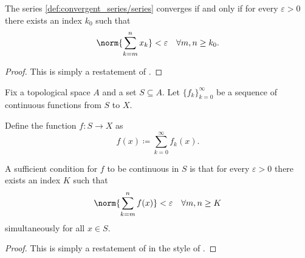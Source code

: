 \begin{proposition}\label{thm:cauchy_series_convergence_criterion}
  The series \eqref{def:convergent_series/series} converges if and only if for every \( \varepsilon > 0 \) there exists an index \( k_0 \) such that
  \begin{equation*}
    \norm{\sum_{k=m}^n x_k} < \varepsilon \quad\forall m, n \geq k_0.
  \end{equation*}
\end{proposition}
\begin{proof}
  This is simply a restatement of .
\end{proof}

\begin{proposition}\label{thm:cauchy_series_continuity_criterion}
  Fix a topological space \( A \) and a set \( S \subseteq A \). Let \( \{ f_k \}_{k=0}^\infty \) be a sequence of continuous functions from \( S \) to \( X \).

  Define the function \( f: S \to X \) as
  \begin{equation}\label{thm:cauchy_series_continuity_criterion/function}
    f(x) \coloneqq \sum_{k=0}^\infty f_k(x).
  \end{equation}

  A sufficient condition for \( f \) to be continuous in \( S \) is that for every \( \varepsilon > 0 \) there exists an index \( K \) such that
  \begin{equation*}
    \norm{\sum_{k=m}^n f(x)} < \varepsilon \quad\forall m, n \geq K
  \end{equation*}
  simultaneously for all \( x \in S \).
\end{proposition}
\begin{proof}
  This is simply a restatement of  in the style of .
\end{proof}

